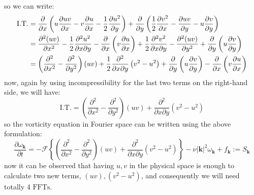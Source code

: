 \documentclass[12pt]{article}
\def\k{\bm{k}}
\begin{document}
%
so we can write:
%
\begin{align}\label{Eq-20}
\text{I.T.} &= \dfrac{\partial}{\partial x} \left(u\dfrac{\partial uv}{\partial x}-v\dfrac{\partial u}{\partial x}-\dfrac{1}{2}\dfrac{\partial u^2}{\partial y}\right)+\dfrac{\partial}{\partial y} \left(\dfrac{1}{2}\dfrac{\partial v^2}{\partial x}- \dfrac{\partial uv}{\partial y}-u\dfrac{\partial v}{\partial y}\right) \notag \\
&= \dfrac{\partial^2 (uv)}{\partial x^2}-\dfrac{1}{2}\dfrac{\partial^2 u^2}{\partial x \partial y}-\dfrac{\partial }{\partial x}\left(v\dfrac{\partial u}{\partial x}\right)+\dfrac{1}{2}\dfrac{\partial^2 v^2}{\partial x \partial y}-\dfrac{\partial^2 (uv)}{\partial y^2}+\dfrac{\partial }{\partial y}\left(u\dfrac{\partial v}{\partial y}\right) \\
&= \left(\dfrac{\partial^2}{\partial x^2}-\dfrac{\partial^2}{\partial y^2}\right)(uv)+\dfrac{1}{2}\dfrac{\partial^2}{\partial x \partial y}\left(v^2 - u^2 \right)+\dfrac{\partial }{\partial y}\left(u\dfrac{\partial v}{\partial y}\right)-\dfrac{\partial }{\partial x}\left(v\dfrac{\partial u}{\partial x}\right) \notag
\end{align}
%
now, again by using incompressibility for the last two terms on the right-hand side, we will have:
%
\begin{equation}\label{Eq-21}
\text{I.T.} =\left(\dfrac{\partial^2}{\partial x^2}-\dfrac{\partial^2}{\partial y^2}\right)(uv)+\dfrac{\partial^2}{\partial x \partial y}\left(v^2 - u^2 \right)
\end{equation}
%
so the vorticity equation in Fourier space can be written using the above formulation:
%
\begin{equation}\label{Eq-22}
\frac{\partial\omega_{\k}}{\partial t} =- \mathcal{F}\left\lbrace\left(\dfrac{\partial^2}{\partial x^2}-\dfrac{\partial^2}{\partial y^2}\right)(uv)+\dfrac{\partial^2}{\partial x \partial y}\left(v^2 - u^2 \right)\right\rbrace-\nu{|\k|}^2\omega_{\k} + f_{\k} :=S_{\k}
\end{equation}
%
now it can be observed that having $u,v$ in the physical space is enough to calculate two new terms, $(uv), (v^2 - u^2)$, and consequently we will need totally 4 $\text{FFTs}$.
\end{document}
